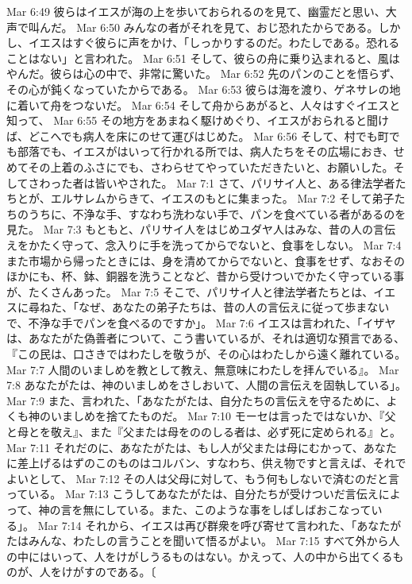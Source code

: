 Mar 6:49  彼らはイエスが海の上を歩いておられるのを見て、幽霊だと思い、大声で叫んだ。
Mar 6:50  みんなの者がそれを見て、おじ恐れたからである。しかし、イエスはすぐ彼らに声をかけ、「しっかりするのだ。わたしである。恐れることはない」と言われた。
Mar 6:51  そして、彼らの舟に乗り込まれると、風はやんだ。彼らは心の中で、非常に驚いた。
Mar 6:52  先のパンのことを悟らず、その心が鈍くなっていたからである。
Mar 6:53  彼らは海を渡り、ゲネサレの地に着いて舟をつないだ。
Mar 6:54  そして舟からあがると、人々はすぐイエスと知って、
Mar 6:55  その地方をあまねく駆けめぐり、イエスがおられると聞けば、どこへでも病人を床にのせて運びはじめた。
Mar 6:56  そして、村でも町でも部落でも、イエスがはいって行かれる所では、病人たちをその広場におき、せめてその上着のふさにでも、さわらせてやっていただきたいと、お願いした。そしてさわった者は皆いやされた。
Mar 7:1  さて、パリサイ人と、ある律法学者たちとが、エルサレムからきて、イエスのもとに集まった。
Mar 7:2  そして弟子たちのうちに、不浄な手、すなわち洗わない手で、パンを食べている者があるのを見た。
Mar 7:3  もともと、パリサイ人をはじめユダヤ人はみな、昔の人の言伝えをかたく守って、念入りに手を洗ってからでないと、食事をしない。
Mar 7:4  また市場から帰ったときには、身を清めてからでないと、食事をせず、なおそのほかにも、杯、鉢、銅器を洗うことなど、昔から受けついでかたく守っている事が、たくさんあった。
Mar 7:5  そこで、パリサイ人と律法学者たちとは、イエスに尋ねた、「なぜ、あなたの弟子たちは、昔の人の言伝えに従って歩まないで、不浄な手でパンを食べるのですか」。
Mar 7:6  イエスは言われた、「イザヤは、あなたがた偽善者について、こう書いているが、それは適切な預言である、『この民は、口さきではわたしを敬うが、その心はわたしから遠く離れている。
Mar 7:7  人間のいましめを教として教え、無意味にわたしを拝んでいる』。
Mar 7:8  あなたがたは、神のいましめをさしおいて、人間の言伝えを固執している」。
Mar 7:9  また、言われた、「あなたがたは、自分たちの言伝えを守るために、よくも神のいましめを捨てたものだ。
Mar 7:10  モーセは言ったではないか、『父と母とを敬え』、また『父または母をののしる者は、必ず死に定められる』と。
Mar 7:11  それだのに、あなたがたは、もし人が父または母にむかって、あなたに差上げるはずのこのものはコルバン、すなわち、供え物ですと言えば、それでよいとして、
Mar 7:12  その人は父母に対して、もう何もしないで済むのだと言っている。
Mar 7:13  こうしてあなたがたは、自分たちが受けついだ言伝えによって、神の言を無にしている。また、このような事をしばしばおこなっている」。
Mar 7:14  それから、イエスは再び群衆を呼び寄せて言われた、「あなたがたはみんな、わたしの言うことを聞いて悟るがよい。
Mar 7:15  すべて外から人の中にはいって、人をけがしうるものはない。かえって、人の中から出てくるものが、人をけがすのである。〔

